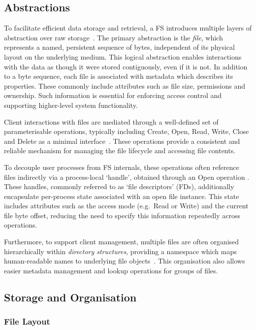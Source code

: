 \subsection{Abstractions}\label{sec:abstractions}

To facilitate efficient data storage and retrieval, a FS introduces multiple layers of abstraction over raw storage~\cite{tanenbaum_modern_2015}. The primary abstraction is the \textit{file}, which represents a named, persistent sequence of bytes, independent of its physical layout on the underlying medium. This logical abstraction enables interactions with the data as though it were stored contiguously, even if it is not. In addition to a byte sequence, each file is associated with metadata which describes its properties. These commonly include attributes such as file size, permissions and ownership. Such information is essential for enforcing access control and supporting higher-level system functionality.

Client interactions with files are mediated through a well-defined set of parameterisable operations, typically including Create, Open, Read, Write, Close and Delete as a minimal interface~\cite{stallings_operating_2011}. These operations provide a consistent and reliable mechanism for managing the file lifecycle and accessing file contents.

To decouple user processes from FS internals, these operations often reference files indirectly via a process-local `handle', obtained through an Open operation \cite{kerrisk2010linux}. These handles, commonly referred to as `file descriptors' (FDs), additionally encapsulate per-process state associated with an open file instance. This state includes attributes such as the access mode (e.g.~Read or Write) and the current file byte offset, reducing the need to specify this information repeatedly across operations.

Furthermore, to support client management, multiple files are often organised hierarchically within \textit{directory structures}, providing a namespace which maps human-readable names to underlying file objects~\cite{silberschatz2013operating}. This organisation also allows easier metadata management and lookup operations for groups of files.

\subsection{Storage and Organisation}
\subsubsection{File Layout}

